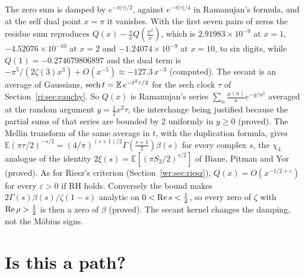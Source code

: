 The zero sum is damped by $e^{-\pi|\gamma|/2}$, against $e^{-\pi|\gamma|/4}$ in Ramanujan's formula, and at the self dual point $x=\pi$ it vanishes. With the first seven pairs of zeros the residue sum reproduces $Q(x)-\frac\pi xQ(\frac{\pi^2}x)$, which is $2.91983\times10^{-9}$ at $x=1$, $-4.52076\times10^{-10}$ at $x=2$ and $-1.24074\times10^{-9}$ at $x=10$, to six digits, while $Q(1)=-0.274679806897$ and the dual term is $-\pi^5/(2\zeta(3)x^3)+O(x^{-5})\approx-127.3\,x^{-3}$ (computed). The secant is an average of Gaussians, $\operatorname{sech} t=\mathbb E\,e^{-t^2\tau/2}$ for the sech clock $\tau$ of Section~\ref{ri:sec:cauchy}. So $Q(x)$ is Ramanujan's series $\sum_n\frac{\mu(n)}ne^{-y/n^2}$ averaged at the random argument $y=\frac12x^2\tau$, the interchange being justified because the partial sums of that series are bounded by $2$ uniformly in $y\ge0$ (proved). The Mellin transform of the same average in $t$, with the duplication formula, gives $\mathbb E(\pi\tau/2)^{-s/2}=(4/\pi)^{(s+1)/2}\Gamma(\frac{s+1}2)\beta(s)$ for every complex $s$, the $\chi_4$ analogue of the identity $2\xi(s)=\mathbb E[(\pi S_2/2)^{s/2}]$ of Biane, Pitman and Yor \cite{BPY01} (proved). As for Riesz's criterion (Section~\ref{wr:sec:riesz}), $Q(x)=O(x^{-1/2+\varepsilon})$ for every $\varepsilon>0$ if RH holds. Conversely the bound makes $2\Gamma(s)\beta(s)/\zeta(1-s)$ analytic on $0<\operatorname{Re} s<\frac12$, so every zero of $\zeta$ with $\operatorname{Re}\rho>\frac12$ is then a zero of $\beta$ (proved). The secant kernel changes the damping, not the M\"obius signs.

\section{Is this a path?}\label{dl:sec:path}

